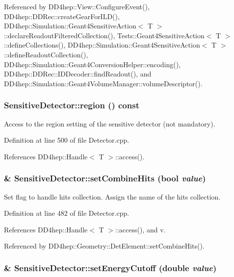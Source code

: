 Referenced by DD4hep::View::ConfigureEvent(), DD4hep::DDRec::createGearForILD(), DD4hep::Simulation::Geant4SensitiveAction$<$ T $>$::declareReadoutFilteredCollection(), Tests::Geant4SensitiveAction$<$ T $>$::defineCollections(), DD4hep::Simulation::Geant4SensitiveAction$<$ T $>$::defineReadoutCollection(), DD4hep::Simulation::Geant4ConversionHelper::encoding(), DD4hep::DDRec::IDDecoder::findReadout(), and DD4hep::Simulation::Geant4VolumeManager::volumeDescriptor().\hypertarget{class_d_d4hep_1_1_geometry_1_1_sensitive_detector_af7fd7953dddb6fce1f6dea711adbba46}{
\subsubsection[{region}]{ SensitiveDetector::region () const}}
\label{class_d_d4hep_1_1_geometry_1_1_sensitive_detector_af7fd7953dddb6fce1f6dea711adbba46}


Access to the region setting of the sensitive detector (not mandatory). 

Definition at line 500 of file Detector.cpp.

References DD4hep::Handle$<$ T $>$::access().\hypertarget{class_d_d4hep_1_1_geometry_1_1_sensitive_detector_a934bd9f3b3c239b6fc751f2b68b26016}{
\subsubsection[{setCombineHits}]{ \& SensitiveDetector::setCombineHits (bool {\em value})}}
\label{class_d_d4hep_1_1_geometry_1_1_sensitive_detector_a934bd9f3b3c239b6fc751f2b68b26016}


Set flag to handle hits collection. Assign the name of the hits collection. 

Definition at line 482 of file Detector.cpp.

References DD4hep::Handle$<$ T $>$::access(), and v.

Referenced by DD4hep::Geometry::DetElement::setCombineHits().\hypertarget{class_d_d4hep_1_1_geometry_1_1_sensitive_detector_a43bc3d1e14b74fbaa85043dedb940a39}{
\subsubsection[{setEnergyCutoff}]{ \& SensitiveDetector::setEnergyCutoff (double {\em value})}}
\label{class_d_d4hep_1_1_geometry_1_1_sensitive_detector_a43bc3d1e14b74fbaa85043dedb940a39}



